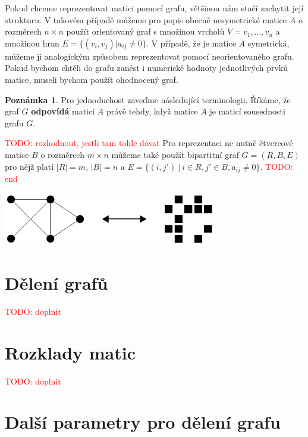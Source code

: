\documentclass[11pt,american,czech,oneside]{book}
\theoremstyle{plain}
\theoremstyle{definition}
\newtheorem{remark}{Poznámka}
\newcommand{\TODO}[1]{\textcolor{red}{TODO: #1}}
\begin{document}
Pokud chceme reprezentovat matici pomocí grafu, většinou nám stačí zachytit její strukturu. V takovém případě můžeme pro popis obecně nesymetrické matice $A$ o rozměrech $n \times n$ použít orientovaný graf s množinou vrcholů $V = {v_1,\ldots,v_n}$ a množinou hran $E =\{(v_i,v_j)|a_{ij}\neq 0\}$. V případě, že je matice $A$ symetrická, můžeme ji analogickým způsobem reprezentovat pomocí neorientovaného grafu.
Pokud bychom chtěli do grafu zanést i numerické hodnoty jednotlivých prvků matice, museli bychom použít ohodnocený graf.

\begin{remark}
  Pro jednoduchost zaveďme následující terminologii. Říkáme, že graf $G$ \textbf{odpovídá} matici $A$ právě tehdy, když matice $A$ je maticí sousednosti grafu $G$.
\end{remark}

\TODO{rozhodnout, jestli tam tohle dávat}
Pro reprezentaci ne nutně čtvercové matice $B$ o rozměrech $m\times n$ můžeme také použít bipartitní graf $G=(R,B,E)$ pro nějž platí $|R|=m$, $|B|=n$ a $E = \{(i,j') \ | \ i \in R, j' \in B, a_{ij} \neq 0 \}$.
\TODO{end}

\bigskip
{
  \label{MatGrPicture}
  \centering
  \includegraphics[width=0.7\textwidth]{pictures/matgr.pdf}
}


\chapter{Dělení grafů}
\TODO{doplnit}


\chapter{Rozklady matic}
\TODO{doplnit}


\chapter{Další parametry pro dělení grafu}
\end{document}
